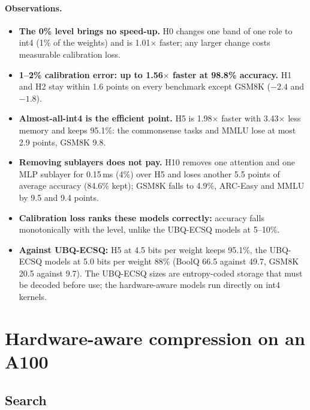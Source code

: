 \documentclass[11pt]{article}
\begin{document}
\paragraph{Observations.}
\begin{itemize}
  \item \textbf{The 0\% level brings no speed-up.} H0 changes one band of one role to int4 (1\% of the
        weights) and is 1.01$\times$ faster; any larger change costs measurable calibration loss.
  \item \textbf{1--2\% calibration error: up to 1.56$\times$ faster at 98.8\% accuracy.} H1 and H2 stay
        within 1.6 points on every benchmark except GSM8K ($-2.4$ and $-1.8$).
  \item \textbf{Almost-all-int4 is the efficient point.} H5 is 1.98$\times$ faster with 3.43$\times$ less
        memory and keeps 95.1\%: the commonsense tasks and MMLU lose at most 2.9 points, GSM8K 9.8.
  \item \textbf{Removing sublayers does not pay.} H10 removes one attention and one MLP sublayer for
        0.15\,ms (4\%) over H5 and loses another 5.5 points of average accuracy (84.6\% kept); GSM8K
        falls to 4.9\%, ARC-Easy and MMLU by 9.5 and 9.4 points.
  \item \textbf{Calibration loss ranks these models correctly:} accuracy falls monotonically with the
        level, unlike the UBQ-ECSQ models at 5--10\%.
  \item \textbf{Against UBQ-ECSQ:} H5 at 4.5 bits per weight keeps 95.1\%, the UBQ-ECSQ models at
        5.0 bits per weight 88\% (BoolQ 66.5 against 49.7, GSM8K 20.5 against 9.7). The UBQ-ECSQ sizes
        are entropy-coded storage that must be decoded before use; the hardware-aware models run
        directly on int4 kernels.
\end{itemize}

\clearpage
\section{Hardware-aware compression on an A100}
\label{sec:a100}

\subsection{Search}
\end{document}
